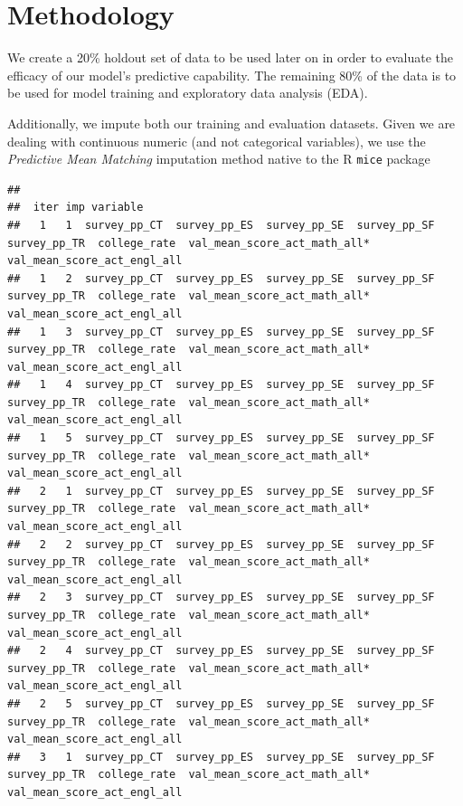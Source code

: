 \documentclass[
  man]{apa6}
\begin{document}
\hypertarget{methodology}{%
\section{Methodology}\label{methodology}}

We create a 20\% holdout set of data to be used later on in order to evaluate the efficacy of our model's predictive capability. The remaining 80\% of the data is to be used for model training and exploratory data analysis (EDA).

Additionally, we impute both our training and evaluation datasets. Given we are dealing with continuous numeric (and not categorical variables), we use the \emph{Predictive Mean Matching} imputation method native to the R \texttt{mice} package

\begin{verbatim}
## 
##  iter imp variable
##   1   1  survey_pp_CT  survey_pp_ES  survey_pp_SE  survey_pp_SF  survey_pp_TR  college_rate  val_mean_score_act_math_all*  val_mean_score_act_engl_all
##   1   2  survey_pp_CT  survey_pp_ES  survey_pp_SE  survey_pp_SF  survey_pp_TR  college_rate  val_mean_score_act_math_all*  val_mean_score_act_engl_all
##   1   3  survey_pp_CT  survey_pp_ES  survey_pp_SE  survey_pp_SF  survey_pp_TR  college_rate  val_mean_score_act_math_all*  val_mean_score_act_engl_all
##   1   4  survey_pp_CT  survey_pp_ES  survey_pp_SE  survey_pp_SF  survey_pp_TR  college_rate  val_mean_score_act_math_all*  val_mean_score_act_engl_all
##   1   5  survey_pp_CT  survey_pp_ES  survey_pp_SE  survey_pp_SF  survey_pp_TR  college_rate  val_mean_score_act_math_all*  val_mean_score_act_engl_all
##   2   1  survey_pp_CT  survey_pp_ES  survey_pp_SE  survey_pp_SF  survey_pp_TR  college_rate  val_mean_score_act_math_all*  val_mean_score_act_engl_all
##   2   2  survey_pp_CT  survey_pp_ES  survey_pp_SE  survey_pp_SF  survey_pp_TR  college_rate  val_mean_score_act_math_all*  val_mean_score_act_engl_all
##   2   3  survey_pp_CT  survey_pp_ES  survey_pp_SE  survey_pp_SF  survey_pp_TR  college_rate  val_mean_score_act_math_all*  val_mean_score_act_engl_all
##   2   4  survey_pp_CT  survey_pp_ES  survey_pp_SE  survey_pp_SF  survey_pp_TR  college_rate  val_mean_score_act_math_all*  val_mean_score_act_engl_all
##   2   5  survey_pp_CT  survey_pp_ES  survey_pp_SE  survey_pp_SF  survey_pp_TR  college_rate  val_mean_score_act_math_all*  val_mean_score_act_engl_all
##   3   1  survey_pp_CT  survey_pp_ES  survey_pp_SE  survey_pp_SF  survey_pp_TR  college_rate  val_mean_score_act_math_all*  val_mean_score_act_engl_all

\end{verbatim}
\end{document}
